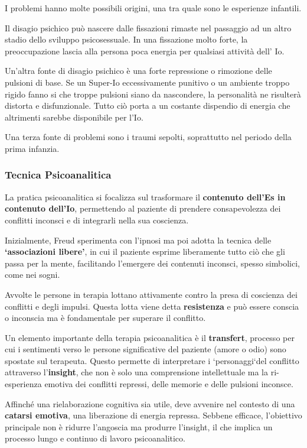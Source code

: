 \documentclass{subfiles}
\begin{document}
I problemi hanno molte possibili origini, una tra quale sono le esperienze infantili. 

Il disagio psichico può nascere dalle fissazioni rimaste nel passaggio ad un altro stadio dello 
sviluppo psicosessuale. In una fissazione molto forte, la preoccupazione lascia alla persona 
poca energia per qualsiasi attività dell' Io.

Un'altra fonte di disagio psichico è una forte repressione o rimozione delle pulsioni di base. 
Se un Super-Io eccessivamente punitivo o un ambiente troppo rigido fanno si che troppe pulsioni 
siano da nascondere, la personalità ne risulterà distorta e disfunzionale. 
Tutto ciò porta a un costante dispendio di energia che altrimenti sarebbe disponibile per l'Io.

Una terza fonte di problemi sono i traumi sepolti, soprattutto nel periodo della prima infanzia.\\

\subsubsection{Tecnica Psicoanalitica}

La pratica psicoanalitica si focalizza sul trasformare il 
\textbf{contenuto dell'Es in contenuto dell'Io}, permettendo al paziente di prendere 
consapevolezza dei conflitti inconsci e di integrarli nella sua coscienza.

Inizialmente, Freud sperimenta con l'ipnosi ma poi adotta la tecnica delle 
\textbf{`associazioni libere'}, in cui il paziente esprime liberamente tutto ciò che gli 
passa per la mente, facilitando l'emergere dei contenuti inconsci, spesso simbolici, come nei sogni.

Avvolte le persone in terapia lottano attivamente contro la presa di coscienza dei conflitti e 
degli impulsi. Questa lotta viene detta \textbf{resistenza} e può essere conscia o inconscia ma 
è fondamentale per superare il conflitto.

Un elemento importante della terapia psicoanalitica è il \textbf{transfert}, processo per cui 
i sentimenti verso le persone significative del paziente (amore o odio) sono spostate sul terapeuta. 
Questo permette di interpretare i `personaggi`del conflitto attraverso l'\textbf{insight}, che 
non è solo una comprensione intellettuale ma la ri-esperienza emotiva dei conflitti 
repressi, delle memorie e delle pulsioni inconsce.

Affinché una rielaborazione cognitiva sia utile, deve avvenire nel contesto di una 
\textbf{catarsi emotiva}, una liberazione di energia repressa. Sebbene efficace, l'obiettivo 
principale non è ridurre l'angoscia ma produrre l'insight, il che implica un processo lungo e 
continuo di lavoro psicoanalitico.
\end{document}
